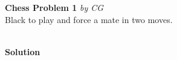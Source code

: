 \documentclass{article}
\begin{document}
\medskip
\newgame
 
\begin{center} 

\large\textbf{Chess Problem 1} \textit{by CG}\\
Black to play and force a mate in two moves.
\vspace{0.25cm}

\showboard
\\

\textbf{Solution} \\

 
\vspace{0.25cm}


\end{center}

\clearpage
\end{document}
